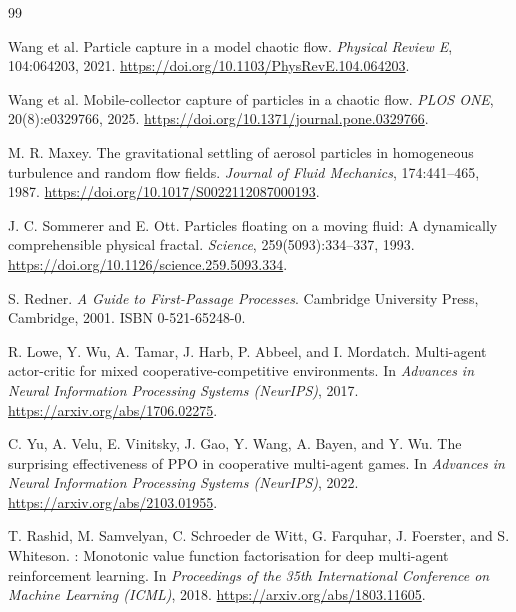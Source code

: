 \documentclass{article}
\begin{document}
\begin{thebibliography}{99}
\small


Wang et al.
\newblock Particle capture in a model chaotic flow.
\newblock \emph{Physical Review E}, 104:064203, 2021.
\newblock \url{https://doi.org/10.1103/PhysRevE.104.064203}.

Wang et al.
\newblock Mobile-collector capture of particles in a chaotic flow.
\newblock \emph{PLOS ONE}, 20(8):e0329766, 2025.
\newblock \url{https://doi.org/10.1371/journal.pone.0329766}.

M. R. Maxey.
\newblock The gravitational settling of aerosol particles in homogeneous
turbulence and random flow fields.
\newblock \emph{Journal of Fluid Mechanics}, 174:441--465, 1987.
\newblock \url{https://doi.org/10.1017/S0022112087000193}.

J. C. Sommerer and E. Ott.
\newblock Particles floating on a moving fluid: A dynamically comprehensible
physical fractal.
\newblock \emph{Science}, 259(5093):334--337, 1993.
\newblock \url{https://doi.org/10.1126/science.259.5093.334}.

S. Redner.
\newblock \emph{A Guide to First-Passage Processes}.
\newblock Cambridge University Press, Cambridge, 2001.
\newblock ISBN 0-521-65248-0.


R. Lowe, Y. Wu, A. Tamar, J. Harb, P. Abbeel, and I. Mordatch.
\newblock Multi-agent actor-critic for mixed cooperative-competitive
environments.
\newblock In \emph{Advances in Neural Information Processing Systems (NeurIPS)},
2017.
\newblock \url{https://arxiv.org/abs/1706.02275}.

C. Yu, A. Velu, E. Vinitsky, J. Gao, Y. Wang, A. Bayen, and Y. Wu.
\newblock The surprising effectiveness of {PPO} in cooperative multi-agent
games.
\newblock In \emph{Advances in Neural Information Processing Systems (NeurIPS)},
2022.
\newblock \url{https://arxiv.org/abs/2103.01955}.

T. Rashid, M. Samvelyan, C. Schroeder de Witt, G. Farquhar, J. Foerster, and
S. Whiteson.
: Monotonic value function factorisation for deep multi-agent
reinforcement learning.
\newblock In \emph{Proceedings of the 35th International Conference on Machine
Learning (ICML)}, 2018.
\newblock \url{https://arxiv.org/abs/1803.11605}.


\end{thebibliography}
\end{document}
